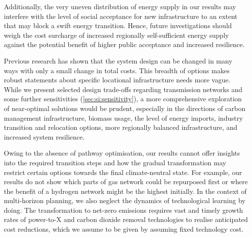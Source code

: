 Additionally, the very uneven distribution of energy supply in our results may
interfere with the level of social acceptance for new infrastructure to an
extent that may block a swift energy transition.
\cite{sasseDistributionalTradeoffs2019,sasseRegionalImpacts2020,sasseLowcarbonElectricity2023} Hence, future
investigations should weigh the cost surcharge of increased regionally
self-sufficient energy supply against the potential benefit of higher public
acceptance and increased resilience.

Previous research has shown that the system design can be changed in many ways
with only a small change in total
costs.\cite{Neumann2019,lombardiPolicyDecision2020,pedersenModelingAll2021,pickeringDiversityOptions2022}
This breadth of options makes robust statements about specific locational
infrastructure needs more vague. While we present selected design trade-offs
regarding transmission networks and some further sensitivities
(\cref{sec:si:sensitivity}), a more comprehensive exploration of near-optimal
solutions would be prudent, especially in the directions of carbon management
infrastructure, biomass usage, the level of energy imports, industry transition
and relocation options, more regionally balanced infrastructure, and increased
system resilience.

Owing to the absence of pathway optimisation, our results cannot offer insights
into the required transition steps and how the gradual transformation may
restrict certain options towards the final climate-neutral state. For example,
our results do not show which parts of gas network could be repurposed first or
where the benefit of a hydrogen network might be the highest initially. In the
context of multi-horizon planning, we also neglect the dynamics of technological
learning by
doing.\cite{heubergerPowerCapacity2017,fellingMultihorizonPlanning2022,zeyenEndogenousLearning2022}
The transformation to net-zero emissions requires vast and timely growth rates
of power-to-X and carbon dioxide removal technologies to realise anticipated
cost reductions,\cite{odenwellerProbabilisticFeasibility2022a} which we assume to
be given by assuming fixed technology cost.

